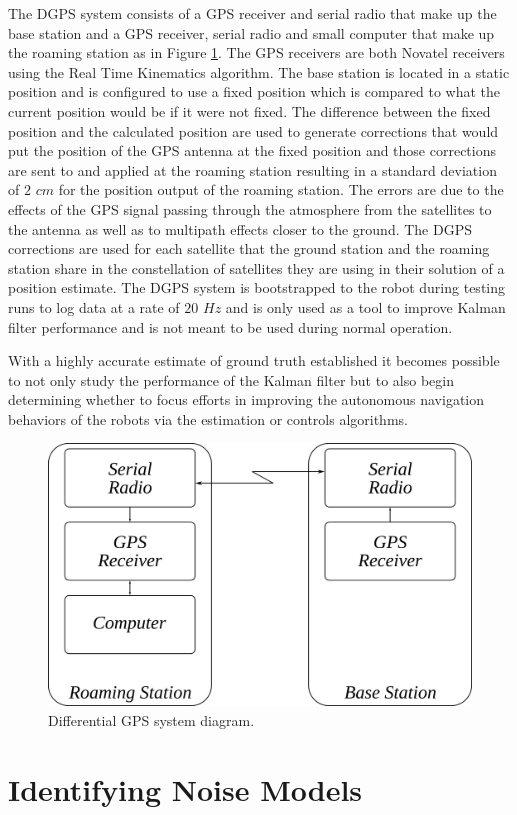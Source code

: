 The DGPS system consists of a GPS receiver and serial radio that make up the base station and a GPS receiver, serial radio and small computer that make up the roaming station as in Figure \ref{fig:dgps}. The GPS receivers are both Novatel receivers using the Real Time Kinematics algorithm. The base station is located in a static position and is configured to use a fixed position which is compared to what the current position would be if it were not fixed. The difference between the fixed position and the calculated position are used to generate corrections that would put the position of the GPS antenna at the fixed position and those corrections are sent to and applied at the roaming station resulting in a standard deviation of $2$ $cm$ for the position output of the roaming station. The errors are due to the effects of the GPS signal passing through the atmosphere from the satellites to the antenna as well as to multipath effects closer to the ground. The DGPS corrections are used for each satellite that the ground station and the roaming station share in the constellation of satellites they are using in their solution of a position estimate. The DGPS system is bootstrapped to the robot during testing runs to log data at a rate of $20$ $Hz$ and is only used as a tool to improve Kalman filter performance and is not meant to be used during normal operation.

With a highly accurate estimate of ground truth established it becomes possible to not only study the performance of the Kalman filter but to also begin determining whether to focus efforts in improving the autonomous navigation behaviors of the robots via the estimation or controls algorithms.

\begin{figure}[ht!]
	\centering
	\includegraphics[width=.6\textwidth]{images/dgps}
	\caption{Differential GPS system diagram.}
	\label{fig:dgps}
\end{figure}

\section{Identifying Noise Models}

